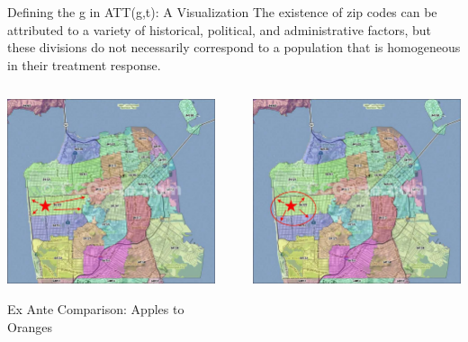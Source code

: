 \begin{frame}{Defining the g in ATT(g,t): A Visualization}
The existence of zip codes can be attributed to a variety of historical, political, and administrative factors, but these divisions do not necessarily correspond to a population that is homogeneous in their treatment response.
\vspace{5pt}

  \begin{columns}
    \begin{column}{0.4\linewidth}
    \centering
      \includegraphics[scale=0.16]{figures/sf_zipcodes_exante.jpeg}
      \caption{\footnotesize{Ex Ante Comparison: Apples to Oranges}}
    \end{column}
    \begin{column}{0.1\linewidth}
    \centering
      \Rightarrow
    \end{column}
    \begin{column}{0.4\linewidth}
    \centering
      \includegraphics[scale=0.16]{figures/sf_zipcodes_expost.jpeg}

\end{column}
\end{columns}
\end{frame}
